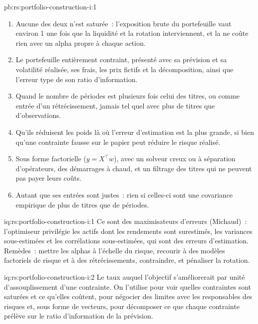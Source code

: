 \begin{solution}{pb:rs:portfolio-construction-i:1}
\begin{enumerate}
3.1~\%, la limite brute et la  ne coûtent rien. Après frais, la limite de rotation rapporte le plus~: le ratio net passe de 0.46 à 1.77.
\item Aucune des deux n'est saturée~: l'exposition brute du portefeuille vaut environ 1 une fois que la liquidité et la rotation interviennent, et la  ne coûte rien avec un alpha propre à chaque action.
\item Le portefeuille entièrement contraint, présenté avec sa prévision et sa volatilité réalisée, ses frais, les prix fictifs et la décomposition, ainsi que l'erreur type de
son ratio d'information.
\item Quand le nombre de périodes est plusieurs fois celui des titres, ou comme entrée d'un rétrécissement, jamais tel quel avec plus de titres que d'observations.
\item Qu'ils réduisent les poids là où l'erreur d'estimation est la plus grande, si bien qu'une contrainte fausse sur le papier peut réduire le risque réalisé.
\item Sous forme factorielle ($y = X^\top w$), avec un solveur creux ou à séparation d'opérateurs, des démarrages à chaud, et un filtrage des titres qui ne peuvent pas payer leurs coûts.
\item Autant que ses entrées sont justes~: rien si celles-ci sont une covariance empirique de plus de titres que de périodes.
\end{enumerate}
\end{solution}

\begin{solution}{iq:rs:portfolio-construction-i:1}
Ce sont des maximisateurs d'erreurs (Michaud)~: l'optimiseur privilégie les actifs dont les rendements sont surestimés, les variances sous-estimées et les corrélations sous-estimées, qui sont
des erreurs d'estimation. Remèdes~: mettre les alphas à l'échelle du risque, recourir à des modèles factoriels de risque et à des rétrécissements, contraindre, et pénaliser la rotation.
\end{solution}

\begin{solution}{iq:rs:portfolio-construction-i:2}
Le taux auquel l'objectif s'améliorerait par unité d'assouplissement d'une contrainte. On l'utilise pour voir quelles contraintes sont saturées et ce qu'elles coûtent, pour négocier des limites
avec les responsables des risques et, sous forme de vecteurs, pour décomposer ce que chaque contrainte prélève sur le ratio d'information de la prévision.
\end{solution}

